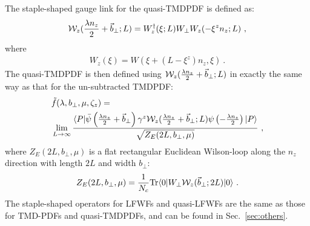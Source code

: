 \documentclass[aps,rmp,reprint,amsmath,amssymb,graphicx,longbibliography]{revtex4-1} %
\DeclareRobustCommand{\sec}[1]{Sec.~\ref{sec:#1}}
\begin{document}
The staple-shaped gauge link for the quasi-TMDPDF is defined as:
\begin{align}
{\cal W}_{z}(\frac{\lambda n_z}{2}+\vec{b}_\perp;L)=W^{\dagger}_{z}(\xi; L)W_{\perp}W_{z}(-\xi^z n_z;L) \ ,
\end{align}
where
\begin{align}
W_z(\xi)=W(\xi+(L-\xi^z) n_z,\xi) \ .
\end{align}
The quasi-TMDPDF is then defined using ${\cal W}_{z}(\frac{\lambda n_z}{2}+\vec{b}_\perp;L)$ in exactly the same way as that for the un-subtracted TMDPDF:
\begin{align}
& \tilde f(\lambda ,b_\perp,\mu,\zeta_z) =\\
& \lim_{L \rightarrow \infty}  \frac{\langle P| \bar \psi\left(\frac{\lambda n_z }{2}+\vec{b}_\perp\right)\gamma^z{\cal W}_{z}(\frac{\lambda n_z}{2}+\vec{b}_\perp;L)\psi\left(-\frac{\lambda n_z}{2}\right) |P\rangle}{\sqrt{Z_E(2L,b_\perp,\mu)}} \ ,\nonumber
\end{align}
where $Z_E(2L,b_\perp,\mu)$ is a flat rectangular Euclidean Wilson-loop along the $n_z$ direction with length $2L$ and width $b_\perp$:
\begin{align}
Z_E(2L,b_\perp,\mu)=\frac{1}{N_c}{\rm Tr}\langle 0|W_{\perp}{\cal W}_z(\vec{b}_\perp;2L)|0\rangle \ .
\end{align}
The staple-shaped operators for LFWFs and quasi-LFWFs are the same as those for TMD-PDFs and quasi-TMDPDFs, and can be found in \sec{others}.


\newpage


\end{document}

